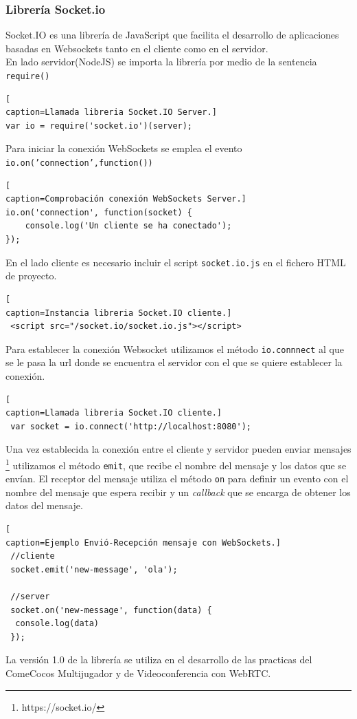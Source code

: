 \subsubsection*{Librería Socket.io}
Socket.IO \cite{socketiO} es una librería de JavaScript que facilita el desarrollo de aplicaciones basadas en Websockets tanto en el cliente como en el servidor.
\\En lado servidor(NodeJS) se importa la librería por medio de la sentencia \texttt{require()}
\begin{lstlisting}[
caption=Llamada libreria Socket.IO Server.]
var io = require('socket.io')(server); 
\end{lstlisting}
Para iniciar la conexión WebSockets se emplea el evento \texttt{io.on('connection',function())} 
\begin{lstlisting}[
caption=Comprobación conexión WebSockets Server.]
io.on('connection', function(socket) {  
    console.log('Un cliente se ha conectado');
});
\end{lstlisting}
En el lado cliente es necesario incluir el script \texttt{socket.io.js} en el fichero HTML de proyecto.
\begin{lstlisting}[
caption=Instancia libreria Socket.IO cliente.]
 <script src="/socket.io/socket.io.js"></script> 
\end{lstlisting}
Para establecer la conexión Websocket utilizamos el método \texttt{io.connnect} al que se le pasa la url donde se encuentra el servidor con el que se quiere establecer la conexión.
\begin{lstlisting}[
caption=Llamada libreria Socket.IO cliente.]
 var socket = io.connect('http://localhost:8080');
\end{lstlisting}
Una vez establecida la conexión entre el cliente y servidor pueden enviar mensajes \footnote{https://socket.io/} utilizamos el método \texttt{emit}, que recibe el nombre del mensaje y los datos que se envían. El receptor del mensaje utiliza el método \texttt{on} para definir un evento  con el nombre del mensaje que espera recibir y un \textit{callback} que se encarga de obtener los datos del mensaje.
\begin{lstlisting}[
caption=Ejemplo Envió-Recepción mensaje con WebSockets.]
 //cliente 
 socket.emit('new-message', 'ola');
 
 //server
 socket.on('new-message', function(data) {  
  console.log(data)
 });
\end{lstlisting}
La versión 1.0 de la librería se utiliza en el desarrollo de las practicas del ComeCocos Multijugador y de Videoconferencia con WebRTC.
